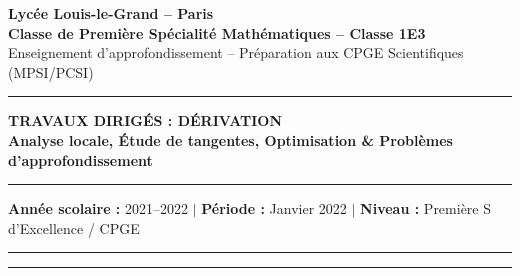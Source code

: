 \documentclass[11pt,a4paper]{article}
\begin{document}
\begin{center}
    {\LARGE \bfseries Lycée Louis-le-Grand -- Paris}\\[0.2cm]
    {\large \textbf{Classe de Première Spécialité Mathématiques -- Classe 1E3}}\\[0.15cm]
    {\normalsize Enseignement d'approfondissement -- Préparation aux CPGE Scientifiques (MPSI/PCSI)}\\[0.35cm]
    \hrule height 1.2pt
    \vspace{0.25cm}
    {\Huge \bfseries TRAVAUX DIRIGÉS : DÉRIVATION}\\[0.2cm]
    {\Large \textbf{Analyse locale, Étude de tangentes, Optimisation \& Problèmes d'approfondissement}}\\[0.25cm]
    \hrule height 0.6pt
    \vspace{0.25cm}
    {\small \textbf{Année scolaire :} 2021--2022 \quad $\vert$ \quad \textbf{Période :} Janvier 2022 \quad $\vert$ \quad \textbf{Niveau :} Première S d'Excellence / CPGE}
\end{center}

\vspace{-0.2cm}
\begin{abstract}
Ce fascicule constitue le recueil exhaustif de cours, de méthodes canoniques et d'exercices d'approfondissement sur le chapitre de la \textbf{Dérivation} pour la classe de Première 1E3 du Lycée Louis-le-Grand (Janvier 2022). Le document s'ouvre sur un exposé axiomatique et conceptuel de l'analyse locale au premier ordre (taux d'accroissement, écriture différentielle de Weierstrass, contact géométrique et multiplicité des racines de l'écart à la tangente). Il propose ensuite la résolution intégrale, rigoureusement rédigée et commentée des \textbf{22 exercices} de la feuille de Travaux Dirigés, regroupés en six sections thématiques : définition et identification polynomiale, tangentes et positions relatives, régularité et dérivabilité (gauche/droite, radicaux, valeur absolue), optimisation géométrique et économique, inégalités fonctionnelles et statistiques, et enfin pathologies différentielles et regards vers la classe de MPSI (régularisation $\mathcal{C}^\infty$, points isolés).
\end{abstract}

\vspace{0.2cm}
\hrule
\vspace{0.2cm}
\tableofcontents
\vspace{0.4cm}
\hrule
\vspace{0.8cm}
\end{document}
